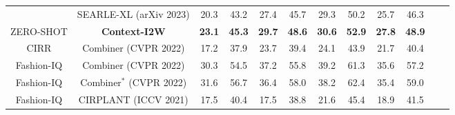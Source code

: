 \documentclass[letterpaper]{article} \usepackage{aaai24}  \usepackage{times}  \usepackage{helvet}  \usepackage{courier}  \usepackage[hyphens]{url}  \usepackage{graphicx} \urlstyle{rm} \def\UrlFont{\rm}  \usepackage{natbib}  \usepackage{caption} \frenchspacing  \setlength{\pdfpagewidth}{8.5in} \setlength{\pdfpageheight}{11in} \usepackage{algorithm}
\begin{document}
\begin{table*}[t]
{\begin{tabular}{cccccccccccc}
                            & SEARLE-XL (arXiv 2023)                                               & 20.3                                 & \multicolumn{1}{c|}{43.2}                        & 27.4                                 & \multicolumn{1}{c|}{45.7}                        & 29.3                                 & \multicolumn{1}{c|}{50.2}                        & 25.7                        & 46.3                        \\
                            \multirow{-6}{*}{ZERO-SHOT} & \textbf{Context-I2W}                                             & \textbf{23.1}                        & \multicolumn{1}{c|}{\textbf{45.3}}               & \textbf{29.7}                        & \multicolumn{1}{c|}{\textbf{48.6}}               & \textbf{30.6}                        & \multicolumn{1}{c|}{\textbf{52.9}}               & \textbf{27.8}               & \textbf{48.9}               \\ \cmidrule(lr){1-10}
CIRR                        & Combiner (CVPR 2022)                                                & 17.2                                 & \multicolumn{1}{c|}{37.9}                        & 23.7                        & \multicolumn{1}{c|}{39.4}                        & 24.1                                 & \multicolumn{1}{c|}{43.9}                        & 21.7                        & 40.4                        \\
Fashion-IQ                  & Combiner (CVPR 2022)                                                & 30.3                                 & \multicolumn{1}{c|}{54.5}                        & 37.2                        & \multicolumn{1}{c|}{55.8}                        & 39.2                                 & \multicolumn{1}{c|}{61.3}                        & 35.6                        & 57.2                        \\ Fashion-IQ                  & Combiner$^*$  (CVPR 2022)                                               & 31.6                                 & \multicolumn{1}{c|}{56.7}                        & 36.4                        & \multicolumn{1}{c|}{58.0}                        & 38.2                                 & \multicolumn{1}{c|}{62.4}                        & 35.4                        & 59.0                        \\
Fashion-IQ                  & CIRPLANT (ICCV 2021)                                              & 17.5                                 & \multicolumn{1}{c|}{40.4}                        & 17.5                        & \multicolumn{1}{c|}{38.8}                        & 21.6                                 & \multicolumn{1}{c|}{45.4}                        & 18.9                        & 41.5                        \\

\end{tabular}}
\end{table*}
\end{document}
